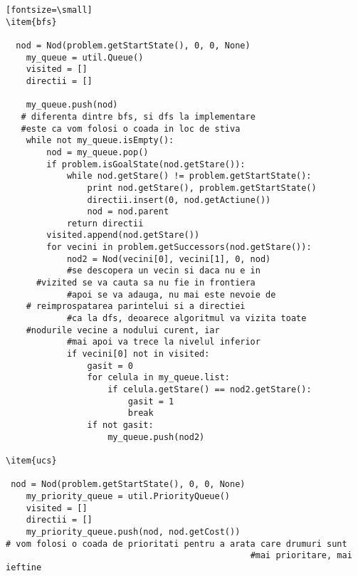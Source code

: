 \begin{verbatim}[fontsize=\small]
\item{bfs}

  nod = Nod(problem.getStartState(), 0, 0, None)
    my_queue = util.Queue()
    visited = []
    directii = []

    my_queue.push(nod) 
   # diferenta dintre bfs, si dfs la implementare  
   #este ca vom folosi o coada in loc de stiva
    while not my_queue.isEmpty():
        nod = my_queue.pop()
        if problem.isGoalState(nod.getStare()):
            while nod.getStare() != problem.getStartState():
                print nod.getStare(), problem.getStartState()
                directii.insert(0, nod.getActiune())
                nod = nod.parent
            return directii
        visited.append(nod.getStare())
        for vecini in problem.getSuccessors(nod.getStare()):
            nod2 = Nod(vecini[0], vecini[1], 0, nod)
            #se descopera un vecin si daca nu e in 
	  #vizited se va cauta sa nu fie in frontiera
            #apoi se va adauga, nu mai este nevoie de
	# reimprospatarea parintelui si a directiei
            #ca la dfs, deoarece algoritmul va vizita toate 
	#nodurile vecine a nodului curent, iar
            #mai apoi va trece la nivelul inferior
            if vecini[0] not in visited:
                gasit = 0
                for celula in my_queue.list:
                    if celula.getStare() == nod2.getStare():
                        gasit = 1
                        break
                if not gasit:
                    my_queue.push(nod2)

\item{ucs}

 nod = Nod(problem.getStartState(), 0, 0, None)
    my_priority_queue = util.PriorityQueue()
    visited = []
    directii = []
    my_priority_queue.push(nod, nod.getCost()) 
# vom folosi o coada de prioritati pentru a arata care drumuri sunt
                                                #mai prioritare, mai ieftine


\end{verbatim}
